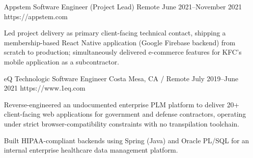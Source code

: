 \begin{cventries}
\jobentry
  {Appstem} %
  {Software Engineer (Project Lead)} %
  {Remote} %
  {June 2021--November 2021} %
  {https://appstem.com} %
  {
    \begin{cvitems}
      \item{Led project delivery as primary client-facing technical contact, shipping a membership-based React Native application (Google Firebase backend) from scratch to production; simultaneously delivered e-commerce features for KFC's mobile application as a subcontractor.}
    \end{cvitems}
  }

\jobentry
  {eQ Technologic} %
  {Software Engineer} %
  {Costa Mesa, CA / Remote} %
  {July 2019--June 2021} %
  {https://www.1eq.com} %
  {
    \begin{cvitems}
      \item{Reverse-engineered an undocumented enterprise PLM platform to deliver 20+ client-facing web applications for government and defense contractors, operating under strict browser-compatibility constraints with no transpilation toolchain.}
      \item{Built HIPAA-compliant backends using Spring (Java) and Oracle PL/SQL for an internal enterprise healthcare data management platform.}
    \end{cvitems}
  }

\end{cventries}
